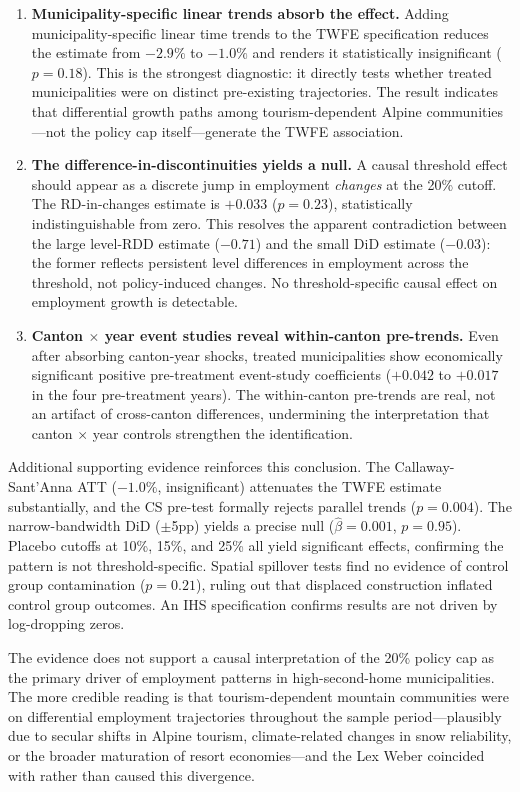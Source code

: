 \documentclass[12pt]{article}
\begin{document}
\begin{enumerate}
  \item \textbf{Municipality-specific linear trends absorb the effect.} Adding municipality-specific linear time trends to the TWFE specification reduces the estimate from $-2.9\%$ to $-1.0\%$ and renders it statistically insignificant ($p = 0.18$). This is the strongest diagnostic: it directly tests whether treated municipalities were on distinct pre-existing trajectories. The result indicates that differential growth paths among tourism-dependent Alpine communities---not the policy cap itself---generate the TWFE association.
  \item \textbf{The difference-in-discontinuities yields a null.} A causal threshold effect should appear as a discrete jump in employment \textit{changes} at the 20\% cutoff. The RD-in-changes estimate is $+0.033$ ($p = 0.23$), statistically indistinguishable from zero. This resolves the apparent contradiction between the large level-RDD estimate ($-0.71$) and the small DiD estimate ($-0.03$): the former reflects persistent level differences in employment across the threshold, not policy-induced changes. No threshold-specific causal effect on employment growth is detectable.
  \item \textbf{Canton $\times$ year event studies reveal within-canton pre-trends.} Even after absorbing canton-year shocks, treated municipalities show economically significant positive pre-treatment event-study coefficients ($+0.042$ to $+0.017$ in the four pre-treatment years). The within-canton pre-trends are real, not an artifact of cross-canton differences, undermining the interpretation that canton $\times$ year controls strengthen the identification.
\end{enumerate}

Additional supporting evidence reinforces this conclusion. The Callaway-Sant'Anna ATT ($-1.0\%$, insignificant) attenuates the TWFE estimate substantially, and the CS pre-test formally rejects parallel trends ($p = 0.004$). The narrow-bandwidth DiD ($\pm$5pp) yields a precise null ($\hat{\beta} = 0.001$, $p = 0.95$). Placebo cutoffs at 10\%, 15\%, and 25\% all yield significant effects, confirming the pattern is not threshold-specific. Spatial spillover tests find no evidence of control group contamination ($p = 0.21$), ruling out that displaced construction inflated control group outcomes. An IHS specification confirms results are not driven by log-dropping zeros.

The evidence does not support a causal interpretation of the 20\% policy cap as the primary driver of employment patterns in high-second-home municipalities. The more credible reading is that tourism-dependent mountain communities were on differential employment trajectories throughout the sample period---plausibly due to secular shifts in Alpine tourism, climate-related changes in snow reliability, or the broader maturation of resort economies---and the Lex Weber coincided with rather than caused this divergence.
\end{document}
